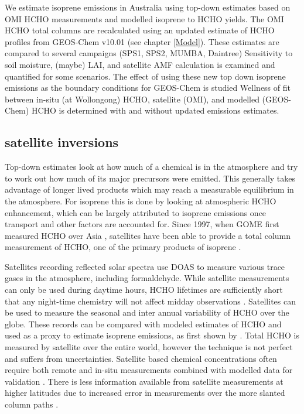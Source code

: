     We estimate isoprene emissions in Australia using top-down estimates based on OMI HCHO measurements and modelled isoprene to HCHO yields.
    The OMI HCHO total columns are recalculated using an updated estimate of HCHO profiles from GEOS-Chem v10.01 (see chapter \ref{Model}).
    These estimates are compared to several campaigns (SPS1, SPS2, MUMBA, Daintree) 
    Sensitivity to soil moisture, (maybe) LAI, and satellite AMF calculation is examined and quantified for some scenarios.
    The effect of using these new top down isoprene emissions as the boundary conditions for GEOS-Chem is studied
    Wellness of fit between in-situ (at Wollongong) HCHO, satellite (OMI), and modelled (GEOS-Chem) HCHO is determined with and without updated emissions estimates.
  
  \subsection{satellite inversions}
    \label{BioIsop:intro:satellite_inversion}
    Top-down estimates look at how much of a chemical is in the atmosphere and try to work out how much of its major precursors were emitted.
    This generally takes advantage of longer lived products which may reach a measurable equilibrium in the atmosphere.
    For isoprene this is done by looking at atmospheric HCHO enhancement, which can be largely attributed to isoprene emissions once transport and other factors are accounted for.
    Since 1997, when GOME first measured HCHO over Asia \parencite{Thomas1998}, satellites have been able to provide a total column measurement of HCHO, one of the primary products of isoprene \parencite{Palmer2001,Bauwens2016}.
    
    Satellites recording reflected solar spectra use DOAS to measure various trace gases in the atmosphere, including formaldehyde. 
    While satellite measurements can only be used during daytime hours, HCHO lifetimes are sufficiently short that any night-time chemistry will not affect midday observations \parencite{Wolfe2016}.
    Satellites can be used to measure the seasonal and inter annual variability of HCHO over the globe.
    These records can be compared with modeled estimates of HCHO and used as a proxy to estimate isoprene emissions, as first shown by \textcite{Palmer2001}.
    Total HCHO is measured by satellite over the entire world, however the technique is not perfect and suffers from uncertainties.
    Satellite based chemical concentrations often require both remote and in-situ measurements combined with modelled data for validation \parencite{Marais2014}.
    There is less information available from satellite measurements at higher latitudes due to increased error in measurements over the more slanted column paths \parencite{DeSmedt2015}.
    
